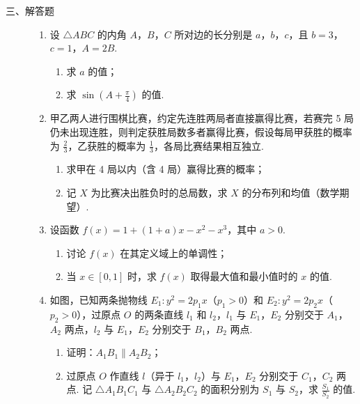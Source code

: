 \begin{description}

    \item[三、解答题]

    \begin{enumerate}[leftmargin=5pt]

      \addtocounter{enumi}{+15}

        \item 设 \(\triangle ABC\) 的内角 \(A\)，\(B\)，\(C\) 所对边的长分别是 \(a\)，\(b\)，\(c\)，且 \(b = 3\)，\(c = 1\)，\(A = 2B\).

\begin{enumerate}
\item 求 \(a\) 的值；
\item 求 \(\sin\left(A+\frac{\pi}{4}\right)\) 的值.
\end{enumerate}

        \item 甲乙两人进行围棋比赛，约定先连胜两局者直接赢得比赛，若赛完 5 局仍未出现连胜，则判定获胜局数多者赢得比赛，假设每局甲获胜的概率为 \(\frac{2}{3}\)，乙获胜的概率为 \(\frac{1}{3}\)，各局比赛结果相互独立.

\begin{enumerate}
\item 求甲在 4 局以内（含 4 局）赢得比赛的概率；
\item 记 \(X\) 为比赛决出胜负时的总局数，求 \(X\) 的分布列和均值（数学期望）.
\end{enumerate}

        \item 设函数 \( f(x) = 1 + (1 + a)x - x^2 - x^3 \)，其中 \( a > 0 \).

\begin{enumerate}
\item 讨论 \(f(x)\) 在其定义域上的单调性；
\item 当 \(x \in [0,1]\) 时，求 \(f(x)\) 取得最大值和最小值时的 \(x\) 的值.
\end{enumerate}

        \item 如图，已知两条抛物线 \(E_{1}: y^{2} = 2p_{1}x\)（\(p_{1} > 0\)）和 \(E_{2}: y^{2} = 2p_{2}x\)（\(p_{2} > 0\)），过原点 \(O\) 的两条直线 \(l_{1}\) 和 \(l_{2}\)，\(l_{1}\) 与 \(E_{1}\)，\(E_{2}\) 分别交于 \(A_{1}\)，\(A_{2}\) 两点，\(l_{2}\) 与 \(E_{1}\)，\(E_{2}\) 分别交于 \(B_{1}\)，\(B_{2}\) 两点.

\begin{enumerate}
\item 证明：\(A_{1}B_{1} \parallel A_{2}B_{2}\)；
\item 过原点 \(O\) 作直线 \(l\)（异于 \(l_{1}\)，\(l_{2}\)）与 \(E_{1}\)，\(E_{2}\) 分别交于 \(C_{1}\)，\(C_{2}\) 两点. 记 \(\triangle A_{1}B_{1}C_{1}\) 与 \(\triangle A_{2}B_{2}C_{2}\) 的面积分别为 \(S_{1}\) 与 \(S_{2}\)，求 \(\frac{S_{1}}{S_{2}}\) 的值.
\end{enumerate}


\end{enumerate}
\end{description}
